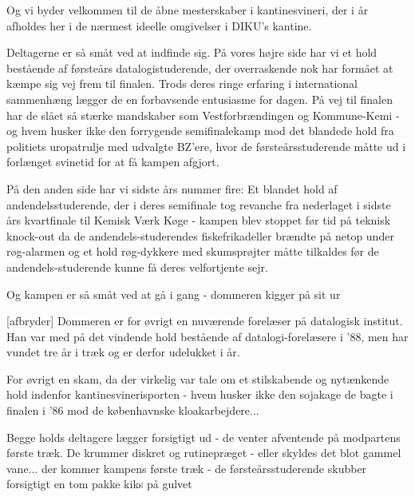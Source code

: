 \documentclass[a4paper,11pt]{article}
\begin{document}
\begin{sketch}

   Og vi byder velkommen til de åbne mesterskaber i
  kantinesvineri, der i år afholdes her i de nærmest ideelle
  omgivelser i DIKU's kantine.


     Deltagerne er så småt ved at indfinde sig. På vores højre side
    har vi et hold bestående af førsteårs datalogistuderende, der overraskende
    nok har formået at kæmpe sig vej frem til finalen. Trods deres ringe
    erfaring i international sammenhæng lægger de en forbavsende entusiasme for
    dagen.  På vej til finalen har de slået så stærke mandskaber som
    Vestforbrændingen og Kommune-Kemi - og hvem husker ikke den forrygende
    semifinalekamp mod det blandede hold fra politiets uropatrulje med udvalgte
    BZ'ere, hvor de førsteårsstuderende måtte ud i forlænget svinetid for at få
    kampen afgjort.


   På den anden side har vi sidste års nummer
  fire: Et blandet hold af andendelsstuderende, der i deres semifinale
  tog revanche fra nederlaget i sidste års kvartfinale til Kemisk Værk
  Køge - kampen blev stoppet før tid på teknisk knock-out da de
  andendels-studerendes fiskefrikadeller brændte på netop under
  røg-alarmen og et hold røg-dykkere med skumsprøjter måtte tilkaldes
  før de andendels-studerende kunne få deres velfortjente sejr.

   Og kampen er så småt ved at gå i gang - dommeren kigger på
  sit ur

  [afbryder] Dommeren er for øvrigt en nuværende forelæser på
  datalogisk institut. Han var med på det vindende hold bestående af
  datalogi-forelæsere i '88, men har vundet tre år i træk og er derfor udelukket
  i år.

   For øvrigt en skam, da der virkelig var tale om et
  stilskabende og nytænkende hold indenfor kantinesvinerisporten -
  hvem husker ikke den sojakage de bagte i finalen i '86 mod de
  københavnske kloakarbejdere...


   Begge holds deltagere lægger forsigtigt ud - de venter
  afventende på modpartens første træk.  De krummer diskret og
  rutinepræget - eller skyldes det blot gammel vane... der kommer
  kampens første træk - de førsteårsstuderende skubber forsigtigt en
  tom pakke kiks på gulvet


\end{sketch}
\end{document}
